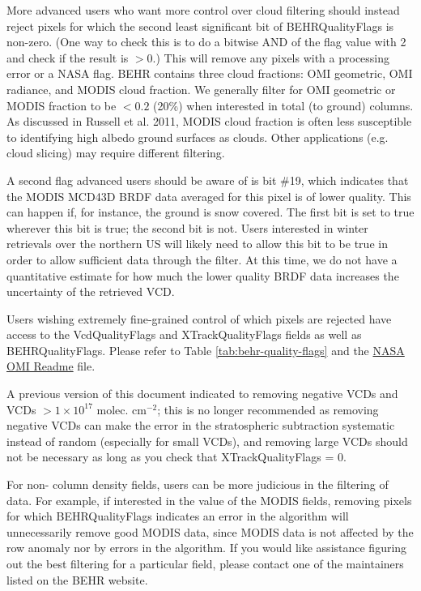\documentclass[12pt]{article}
\begin{document}
	More advanced users who want more control over cloud filtering should instead reject pixels for which the second least significant bit of BEHRQualityFlags is non-zero. (One way to check this is to do a bitwise AND of the flag value with 2 and check if the result is $> 0$.) This will remove any pixels with a processing error or a NASA flag. BEHR contains three cloud fractions: OMI geometric, OMI radiance, and MODIS cloud fraction. We generally filter for OMI geometric or MODIS fraction to be $< 0.2$ (20\%) when interested in total (to ground) columns.  As discussed in Russell et al. 2011, MODIS cloud fraction is often less susceptible to identifying high albedo ground surfaces as clouds. Other applications (e.g. cloud slicing) may require different filtering.
	
	A second flag advanced users should be aware of is bit \#19, which indicates that the MODIS MCD43D BRDF data averaged for this pixel is of lower quality. This can happen if, for instance, the ground is snow covered. The first bit is set to true wherever this bit is true; the second bit is not. Users interested in winter retrievals over the northern US will likely need to allow this bit to be true in order to allow sufficient data through the filter. At this time, we do not have a quantitative estimate for how much the lower quality BRDF data increases the uncertainty of the retrieved VCD.
	
	Users wishing extremely fine-grained control of which pixels are rejected have access to the VcdQualityFlags and XTrackQualityFlags fields as well as BEHRQualityFlags. Please refer to Table \ref{tab:behr-quality-flags} and the \href{https://acdisc.gesdisc.eosdis.nasa.gov/data//Aura_OMI_Level3/OMNO2d.003/doc/README.OMNO2.pdf}{NASA OMI  Readme} file.
	
	A previous version of this document indicated to removing negative VCDs and VCDs $> 1 \times 10^{17}$ molec. cm$^{-2}$; this is no longer recommended as removing negative VCDs can make the error in the stratospheric subtraction systematic instead of random (especially for small VCDs), and removing large VCDs should not be necessary as long as you check that XTrackQualityFlags = 0.
	
	For non- column density fields, users can be more judicious in the filtering of data. For example, if interested in the value of the MODIS fields, removing pixels for which BEHRQualityFlags indicates an error in the  algorithm will unnecessarily remove good MODIS data, since MODIS data is not affected by the row anomaly nor by errors in the  algorithm. If you would like assistance figuring out the best filtering for a particular field, please contact one of the maintainers listed on the BEHR website.
\end{document}
